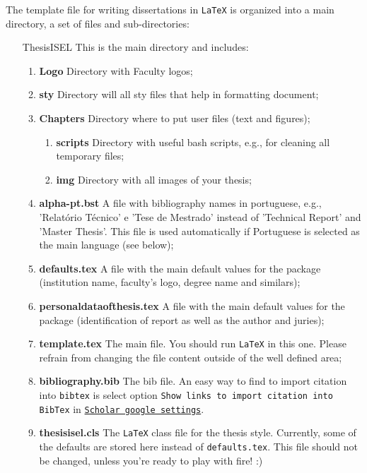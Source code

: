 The template file for writing dissertations in  \texttt{LaTeX} is organized into a main directory, a set of files and sub-directories:
\begin{enumerate}
    \item[ThesisISEL] This is the main directory and includes:
    \begin{enumerate}
        \item \textbf{Logo} Directory with Faculty logos;
        \item \textbf{sty} Directory will all sty files that help in formatting document;
        \item \textbf{Chapters} Directory where to put user files (text and figures);
        \begin{enumerate}
            \item \textbf{scripts} Directory with useful bash scripts, e.g., for cleaning all temporary files;
            \item \textbf{img} Directory with all images of your thesis;
        \end{enumerate}
        \item \textbf{alpha-pt.bst} A file with bibliography names in portuguese, e.g., 'Relatório Técnico' e 'Tese de Mestrado' instead of 'Technical Report' and 'Master Thesis'. This file is used automatically if Portuguese is selected as the main language (see below);
        \item \textbf{defaults.tex} A file with the main default values for the package (institution name, faculty's logo, degree name and similars);
        \item \textbf{personaldataofthesis.tex} A file with the main default values for the package (identification of report as well as the author and juries);
        \item \textbf{template.tex} The main file. You should run  \texttt{LaTeX} in this one. Please refrain from changing the file content outside of the well defined area;
        \item \textbf{bibliography.bib} The bib file. An easy way to find to import citation into \texttt{bibtex} is select option \texttt{Show links to import citation into
        Bib\-Tex} in \href{http://scholar.google.pt/scholar_settings?hl=en&as_sdt=0,5}{\texttt{Scholar google settings}}.
        \item \textbf{thesisisel.cls} The  \texttt{LaTeX} class file for the thesis{} style. Currently, some of the defaults are stored here instead of \verb!defaults.tex!. This file should not be changed, unless you're ready to play with fire! :)
    \end{enumerate}
\end{enumerate}

